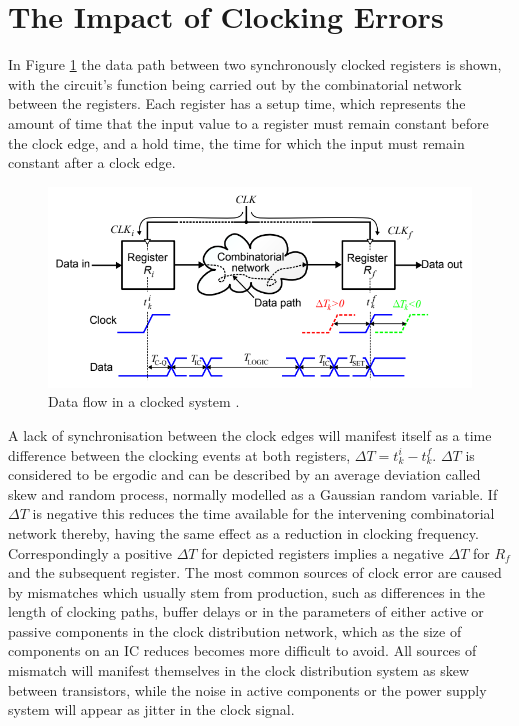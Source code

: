 \section{The Impact of Clocking Errors}
In Figure \ref{fig:eldar_why_precise_clocking} the data path between two synchronously clocked registers is shown, with the circuit's function being carried out by the combinatorial network between the registers.
Each register has a setup time, which represents the amount of time that the input value to a register must remain constant before the clock edge, and a hold time, the time for which the input must remain constant after a clock edge.
\begin{figure}[h]
	\centering
	\includegraphics[scale=0.6]{../eldar_why_precise_clocking}
	\caption[Data flow in a clocked system]{Data flow in a clocked system \cite{zianbetov2013phd}.}
	\label{fig:eldar_why_precise_clocking}
\end{figure}

A lack of synchronisation between the clock edges will manifest itself as a time difference between the clocking events at both registers, $\Delta T = t^i_k - t^f_k$. $\Delta T$ is considered to be ergodic and can be described by an average deviation called skew and random process, normally modelled as a Gaussian random variable. If $\Delta T$ is negative this reduces the time available for the intervening combinatorial network thereby, having the same effect as a reduction in clocking frequency. Correspondingly a positive $\Delta T$ for depicted registers implies a negative $\Delta T$ for $R_f$ and the subsequent register. 
The most common sources of clock error are caused by mismatches which usually stem from production, such as differences in the length of clocking paths, buffer delays or in the parameters of either active or passive components in the clock distribution network, which as the size of components on an \ac{IC} reduces becomes more difficult to avoid. All sources of mismatch will manifest themselves in the clock distribution system as skew between transistors, while the noise in active components or the power supply system will appear as jitter in the clock signal.

